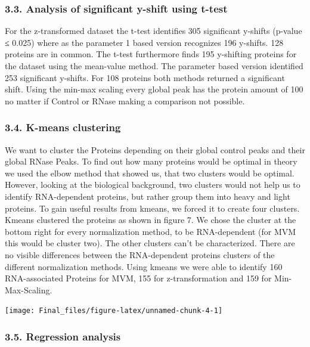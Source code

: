 \documentclass[
  12pt,
]{article}
\begin{document}
\hypertarget{analysis-of-significant-y-shift-using-t-test-1}{%
\subsubsection{3.3. Analysis of significant y-shift using
t-test}\label{analysis-of-significant-y-shift-using-t-test-1}}

For the z-transformed dataset the t-test identifies 305 significant
y-shifts (p-value ≤ 0.025) where as the parameter 1 based version
recognizes 196 y-shifts. 128 proteins are in common. The t-test
furthermore finds 195 y-shifting proteins for the dataset using the
mean-value method. The parameter based version identified 253
significant y-shifts. For 108 proteins both methods returned a
significant shift. Using the min-max scaling every global peak has the
protein amount of 100 no matter if Control or RNase making a comparison
not possible.

\hypertarget{k-means-clustering-1}{%
\subsubsection{3.4. K-means clustering}\label{k-means-clustering-1}}

We want to cluster the Proteins depending on their global control peaks
and their global RNase Peaks. To find out how many proteins would be
optimal in theory we used the elbow method that showed us, that two
clusters would be optimal. However, looking at the biological
background, two clusters would not help us to identify RNA-dependent
proteins, but rather group them into heavy and light proteins. To gain
useful results from kmeans, we forced it to create four clusters. Kmeans
clustered the proteins as shown in figure 7. We chose the cluster at the
bottom right for every normalization method, to be RNA-dependent (for
MVM this would be cluster two). The other clusters can't be
characterized. There are no visible differences between the
RNA-dependent proteins clusters of the different normalization methods.
Using kmeans we were able to identify 160 RNA-associated Proteins for
MVM, 155 for z-transformation and 159 for Min-Max-Scaling.

\texttt{[image: Final\_files/figure-latex/unnamed-chunk-4-1]}

\hypertarget{regression-analysis-1}{%
\subsubsection{3.5. Regression analysis}\label{regression-analysis-1}}
\end{document}
